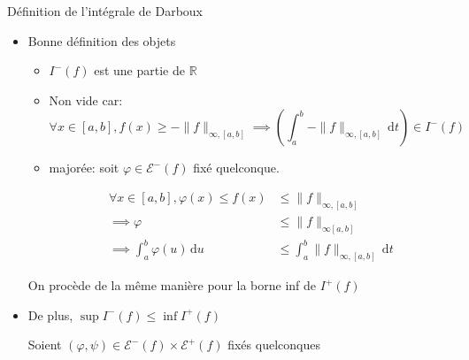 \documentclass{article}
\begin{document}
\begin{question_kholle}[{Soit $f \in \mathcal{CM}([a, b], \mathbb{R})$
	Posons
	
	\begin{align*}
		\mathcal{E}^{-}(f)=\{ \varphi \in \mathcal{E}([a, b],\mathbb{R}) \mid \varphi \leqslant f \}&  
		&\mathcal{E}^{+}(f)=\{ \varphi \in \mathcal{E}([a, b],\mathbb{R}) \mid \varphi \geqslant f \}
	\end{align*}
	
	et 
	
	\begin{align*}
		I^{-}(f)= \left\{ \int_{a}^{b} \varphi(u) \, \mathrm du \Bigg| \varphi \in \mathcal{E}^{-}(f)  \right\} 
		& &
		I^{+}(f)= \left\{ \int_{a}^{b} \varphi(u) \, \mathrm du \Bigg| \varphi \in \mathcal{E}^{+}(f)  \right\} 
	\end{align*}
	
	Alors $\sup I^{-}(f) = \inf I^{+}(f)$ que l'on notera $\int_{a}^{b} f(u) \, \mathrm du$}]{Définition de l'intégrale de Darboux}
	
	\begin{itemize}[label=$\lozenge$]
		\item Bonne définition des objets
		\begin{itemize}[label=$\star$]
			\item $I^{-}(f)$ est une partie de $\mathbb{R}$
			\item Non vide car:
$$
			\forall x \in [a, b], f(x) \geqslant - \|f\|_{\infty, [a, b]} \implies \left( \int_{a}^{b} - \|f\|_{\infty,[a, b]} \, \mathrm dt  \right)  \in I^{-}(f)
$$
			\item majorée: soit $\varphi \in \mathcal{E}^{-}(f)$ fixé quelconque.
			
			\begin{align*}
				\forall x \in [a, b], \varphi(x)\leqslant f(x) &\leqslant \|f\|_{\infty, [a, b]} \\
				\implies \varphi &\leqslant \|f\|_{\infty[a, b]} \\
				\implies \int_{a}^{b} \varphi(u) \, \mathrm du  & \leqslant  \int_{a}^{b} \|f\|_{\infty, [a, b]}  \, \mathrm dt
			\end{align*}
		\end{itemize}
		
		On procède de la même manière pour la borne inf de $I^{+}(f)$
		
		\item De plus, $\sup I^{-}(f) \leqslant \inf I^{+}(f)$
		
		Soient $(\varphi, \psi) \in \mathcal{E}^{-}(f)\times \mathcal{E}^{+}(f)$ fixés quelconques
		

\end{itemize}
\end{question_kholle}
\end{document}
